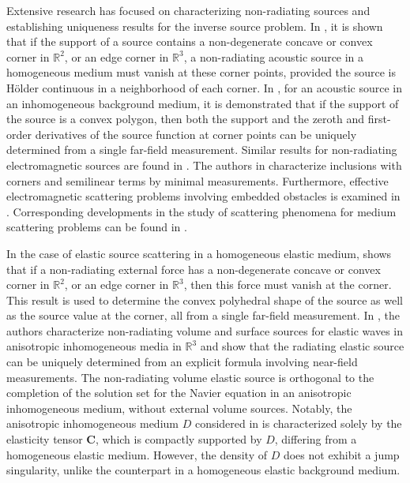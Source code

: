 \documentclass[11pt,reqno,oneside]{amsart}
\theoremstyle{definition}
\theoremstyle{remark}
\numberwithin{equation}{section}
\numberwithin{equation}{section}
\theoremstyle{remark}
\begin{document}
Extensive research has focused on characterizing non-radiating sources and establishing uniqueness results for the inverse source problem. In \cite{blaasten2018nonradiating}, it is shown that if the support of a source contains a non-degenerate concave or convex corner in $\mathbb{R}^2$, or an edge corner in $\mathbb{R}^3$, a non-radiating acoustic source in a homogeneous medium must vanish at these corner points, provided the source is H\"older continuous in a neighborhood of each corner. In \cite{hu2020inverse}, for an acoustic source in an inhomogeneous background medium, it is demonstrated that if the support of the source is a convex polygon, then both the support and the zeroth and first-order derivatives of the source function at corner points can be uniquely determined from a single far-field measurement. Similar results for non-radiating electromagnetic sources are found in \cite{blaasten2021electromagnetic, li2024nonradiating}. The authors in \cite{DFLW2025} characterize inclusions with corners and semilinear terms by minimal measurements. Furthermore, effective electromagnetic scattering problems involving embedded obstacles is examined in \cite{DLMW20251}. Corresponding developments in the study of scattering phenomena for medium scattering problems can be found in \cite{blaasten2021scattering,blaasten2014corners,cakoni2023regularity,cakoni2023singularities,cakoni2020corner,DFLY24,DTLT24, DLMW20252,elschner2018acoustic,kow2024scattering,paivarinta2017strictly,salo2021free}. 

In the case of elastic source scattering in a homogeneous elastic medium, \cite{blaasten2018radiating} shows that if a non-radiating external force has a non-degenerate concave or convex corner in $\mathbb{R}^2$, or an edge corner in $\mathbb{R}^3$, then this force must vanish at the corner. This result is used to determine the convex polyhedral shape of the source as well as the source value at the corner, all from a single far-field measurement. In \cite{kow2021characterization}, the authors characterize non-radiating volume and surface sources for elastic waves in anisotropic inhomogeneous media in $\mathbb{R}^3$ and show that the radiating elastic source can be uniquely determined from an explicit formula involving near-field measurements. The non-radiating volume elastic source is orthogonal to the completion of the solution set for the Navier equation in an anisotropic inhomogeneous medium, without external volume sources. Notably, the anisotropic inhomogeneous medium $D$ considered in \cite{kow2021characterization} is characterized solely by the elasticity tensor $\mathbf{C}$, which is compactly supported by $D$, differing from a homogeneous elastic medium. However, the density of $D$ does not exhibit a jump singularity, unlike the counterpart in a homogeneous elastic background medium.
\end{document}
